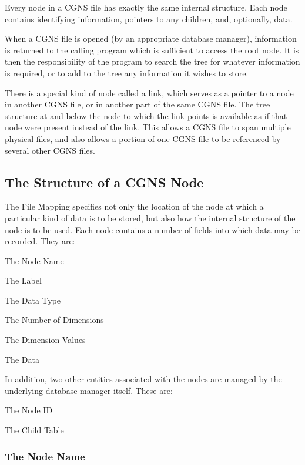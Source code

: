 Every node in a CGNS file has exactly the same internal structure. Each
node contains identifying information, pointers to any children, and,
optionally, data.

When a CGNS file is opened (by an appropriate database manager),
information is returned to the calling program which is sufficient to
access the root node. It is then the responsibility of the program to
search the tree for whatever information is required, or to add to the
tree any information it wishes to store.

There is a special kind of node called a link, which serves as a pointer
to a node in another CGNS file, or in another part of the same CGNS
file. The tree structure at and below the node to which the link points
is available as if that node were present instead of the link. This
allows a CGNS file to span multiple physical files, and also allows a
portion of one CGNS file to be referenced by several other CGNS files.

\subsection{The Structure of a CGNS Node}
\label{s:nodestructure}

The File Mapping specifies not only the location of the node at which
a particular kind of data is to be stored, but also how the internal
structure of the node is to be used. Each node contains a number of
fields into which data may be recorded. They
are:

\begin{itemize*}
\item The Node Name
\item The Label
\item The Data Type
\item The Number of Dimensions
\item The Dimension Values
\item The Data
\end{itemize*}
In addition, two other entities associated with the nodes are managed by
the underlying database manager itself. These are:
\begin{itemize*}
\item The Node ID
\item The Child Table
\end{itemize*}

\subsubsection{The Node Name}

